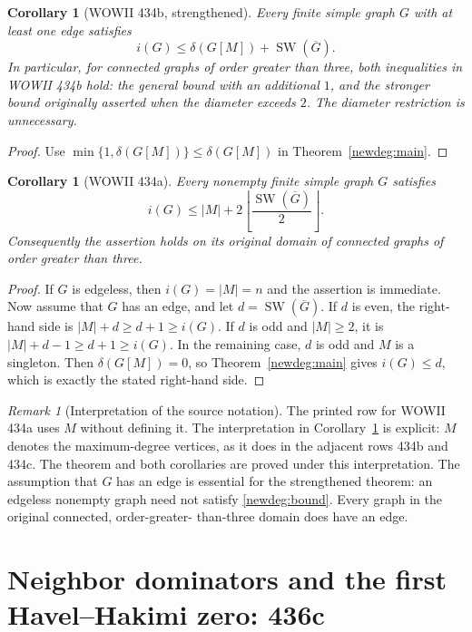 \documentclass[11pt,a4paper]{article}
\newtheorem{corollary}[theorem]{Corollary}
\theoremstyle{remark}
\newtheorem{remark}[theorem]{Remark}
\begin{document}
\begin{corollary}[WOWII 434b, strengthened]
\label{newdeg:434b}
Every finite simple graph $G$ with at least one edge satisfies
\[
 i(G)\le \delta(G[M])+\operatorname{SW}(\overline G).
\]
In particular, for connected graphs of order greater than three, both
inequalities in WOWII 434b hold: the general bound with an additional $1$,
and the stronger bound originally asserted when the diameter exceeds $2$.
The diameter restriction is unnecessary.
\end{corollary}

\begin{proof}
Use $\min\{1,\delta(G[M])\}\le\delta(G[M])$ in
Theorem~\ref{newdeg:main}.
\end{proof}

\begin{corollary}[WOWII 434a]
\label{newdeg:434a}
Every nonempty finite simple graph $G$ satisfies
\[
 i(G)\le |M|+
 2\left\lfloor\frac{\operatorname{SW}(\overline G)}{2}\right\rfloor.
\]
Consequently the assertion holds on its original domain of connected
graphs of order greater than three.
\end{corollary}

\begin{proof}
If $G$ is edgeless, then $i(G)=|M|=n$ and the assertion is immediate.
Now assume that $G$ has an edge, and let
$d=\operatorname{SW}(\overline G)$.  If $d$ is even, the
right-hand side is $|M|+d\ge d+1\ge i(G)$.  If $d$ is odd and
$|M|\ge2$, it is $|M|+d-1\ge d+1\ge i(G)$.  In the remaining case,
$d$ is odd and $M$ is a singleton.  Then $\delta(G[M])=0$, so
Theorem~\ref{newdeg:main} gives $i(G)\le d$, which is exactly the stated
right-hand side.
\end{proof}

\begin{remark}[Interpretation of the source notation]
\label{newdeg:source}
The printed row for WOWII 434a uses $M$ without defining it.  The
interpretation in Corollary~\ref{newdeg:434a} is explicit: $M$ denotes the
maximum-degree vertices, as it does in the adjacent rows 434b and 434c.
The theorem and both corollaries are proved under this interpretation.
The assumption that $G$ has an edge is essential for the strengthened
theorem: an edgeless nonempty graph need not satisfy
\eqref{newdeg:bound}.  Every graph in the original connected, order-greater-
than-three domain does have an edge.
\end{remark}
\section{Neighbor dominators and the first Havel--Hakimi zero: 436c}
\label{r3d:section}
\end{document}
